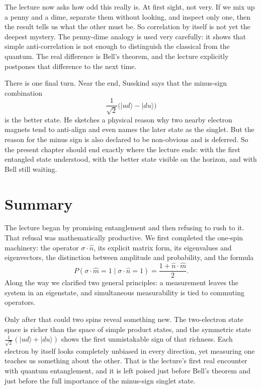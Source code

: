 The lecture now asks how odd this really is. At first sight, not very. If we mix up a penny and a dime, separate them without looking, and inspect only one, then the result tells us what the other must be. So correlation by itself is not yet the deepest mystery. The penny-dime analogy is used very carefully: it shows that simple anti-correlation is not enough to distinguish the classical from the quantum. The real difference is Bell's theorem, and the lecture explicitly postpones that difference to the next time.

There is one final turn. Near the end, Susskind says that the minus-sign combination
\begin{equation}
\frac{1}{\sqrt2}\bigl(|ud\rangle-|du\rangle\bigr)
\end{equation}
is the better state. He sketches a physical reason why two nearby electron magnets tend to anti-align and even names the later state as the singlet. But the reason for the minus sign is also declared to be non-obvious and is deferred. So the present chapter should end exactly where the lecture ends: with the first entangled state understood, with the better state visible on the horizon, and with Bell still waiting.

\section{Summary}

The lecture began by promising entanglement and then refusing to rush to it. That refusal was mathematically productive. We first completed the one-spin machinery: the operator \(\sigma\cdot\hat n\), its explicit matrix form, its eigenvalues and eigenvectors, the distinction between amplitude and probability, and the formula
\begin{equation}
P(\sigma\cdot\hat m=1 \mid \sigma\cdot\hat n=1)=\frac{1+\hat n\cdot\hat m}{2}.
\end{equation}
Along the way we clarified two general principles: a measurement leaves the system in an eigenstate, and simultaneous measurability is tied to commuting operators.

Only after that could two spins reveal something new. The two-electron state space is richer than the space of simple product states, and the symmetric state \(\frac{1}{\sqrt2}(|ud\rangle+|du\rangle)\) shows the first unmistakable sign of that richness. Each electron by itself looks completely unbiased in every direction, yet measuring one teaches us something about the other. That is the lecture's first real encounter with quantum entanglement, and it is left poised just before Bell's theorem and just before the full importance of the minus-sign singlet state.